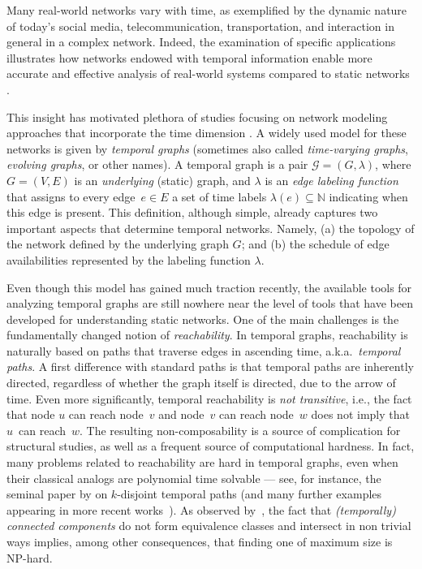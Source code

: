 \documentclass[a4paper,11pt]{article}
\theoremstyle{definition}
\theoremstyle{plain}
\newcommand{\NN}{\ensuremath{\mathbb{N}}}
\newcommand{\G}{\mathcal G}
\begin{document}
Many real-world networks vary with time,
as exemplified by the dynamic nature of today's social media, telecommunication, transportation, and interaction in general in a complex network.
Indeed, the examination of specific applications illustrates how networks endowed with temporal information enable more accurate and effective analysis of real-world systems compared to static networks \cite{tang2013applications}. 
 

This insight has motivated plethora of studies focusing on network mod\-eling approaches that incorporate the time dimension \cite{KKK02,holme2012temporal, holme2019temporal}.
A widely used model for these networks is given by \emph{temporal graphs} (sometimes also called \emph{time-varying graphs}, \emph{evolving graphs}, or other names).
%
A temporal graph is a pair $\G = (G, \lambda)$, where $G=(V,E)$ is an \emph{underlying} (static) graph, and $\lambda$ is an \emph{edge labeling function} that assigns to every edge~$e \in E$ a set of time labels $\lambda(e) \subseteq \NN$ indicating when this edge is present.
%
This definition, although simple, already captures two important aspects that determine 
temporal networks. Namely, (a) the topology of the network defined by the underlying graph $G$; and (b) the schedule of edge availabilities represented by the labeling function $\lambda$.

Even though this model has gained much traction recently, the available tools for analyzing temporal graphs are still nowhere near the level of tools that have been developed for understanding static networks.
One of the main challenges is the fundamentally changed notion of \emph{reachability}.
In temporal graphs, reachability is naturally based on paths that traverse edges in
ascending time, a.k.a.\ \emph{temporal paths}. 
A first difference with standard paths is that temporal paths are inherently directed, regardless
of whether the graph itself is directed, due to the arrow of time.
Even more significantly, temporal reachability is
\emph{not transitive}, i.e., the fact that node $u$ can reach node~$v$
and node~$v$ can reach node~$w$ does not imply that~$u$~can reach~$w$.
The resulting non-composability is a source of complication
for structural studies, as well as a frequent source of computational hardness.
In fact,
many problems related to reachability are hard in temporal graphs,
even when their classical analogs are polynomial time solvable
--- see, for instance, the seminal paper by \textcite{KKK02}
on $k$-disjoint temporal paths (and many further examples appearing in
more recent works~\cite{Akr+17, CCMP20, waiting-time, minimization,
  separators, diameter, EMMZ21}).
As observed by~\textcite{BF03}, the fact that \emph{(temporally) connected components} do not form equivalence classes and intersect in non trivial ways implies, among other consequences, that finding one of maximum size is NP-hard.
\end{document}
